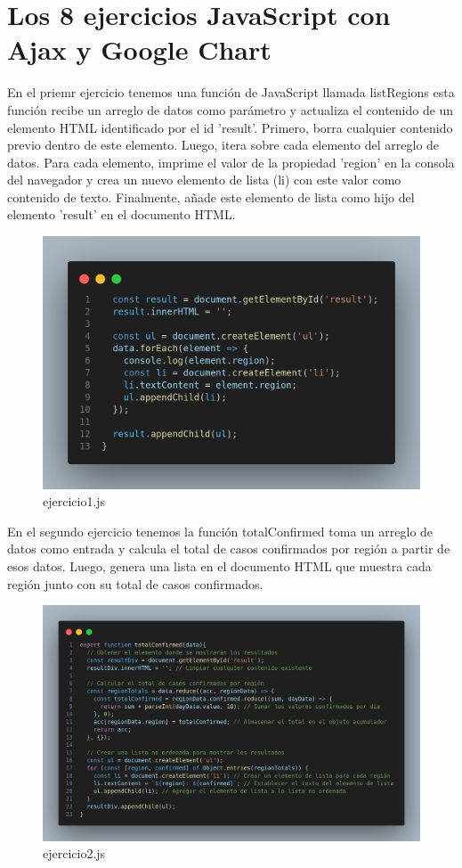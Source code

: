 \section{Los 8 ejercicios JavaScript con Ajax y Google Chart}
En el priemr ejercicio tenemos una función de JavaScript llamada listRegions esta función recibe un arreglo de datos como parámetro y actualiza el contenido de un elemento HTML identificado por el id 'result'. Primero, borra cualquier contenido previo dentro de este elemento. Luego, itera sobre cada elemento del arreglo de datos. Para cada elemento, imprime el valor de la propiedad 'region' en la consola del navegador y crea un nuevo elemento de lista (li) con este valor como contenido de texto. Finalmente, añade este elemento de lista como hijo del elemento 'result' en el documento HTML.
\begin{figure}[H]
  \centering
  \includegraphics[width=1.0\textwidth]{img/1_js.png}
  \caption{ejercicio1.js}
\end{figure}
En el segundo ejercicio tenemos la función totalConfirmed toma un arreglo de datos como entrada y calcula el total de casos confirmados por región a partir de esos datos. Luego, genera una lista en el documento HTML que muestra cada región junto con su total de casos confirmados.
\begin{figure}[H]
  \centering
  \includegraphics[width=1.0\textwidth]{img/2_js.png}
  \caption{ejercicio2.js}
\end{figure}
